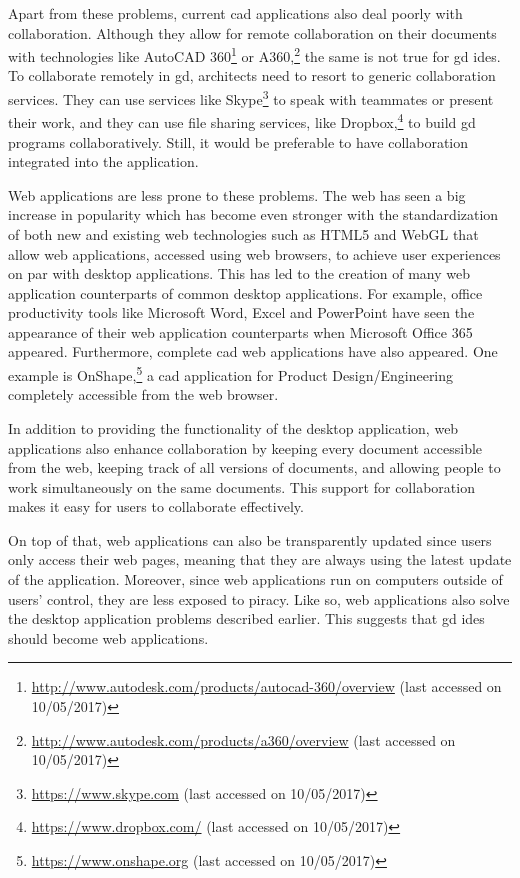 Apart from these problems, current \gls{cad} applications also deal poorly with collaboration.
Although they allow for remote collaboration on their documents with technologies like AutoCAD 360\footnote{\url{http://www.autodesk.com/products/autocad-360/overview} (last accessed on 10/05/2017)} or A360,\footnote{\url{http://www.autodesk.com/products/a360/overview} (last accessed on 10/05/2017)} the same is not true for \gls{gd} \glspl{ide}.
To collaborate remotely in \gls{gd}, architects need to resort to generic collaboration services.
They can use services like Skype\footnote{\url{https://www.skype.com} (last accessed on 10/05/2017)} to speak with teammates or present their work, and they can use file sharing services, like Dropbox,\footnote{\url{https://www.dropbox.com/} (last accessed on 10/05/2017)} to build \gls{gd} programs collaboratively.
Still, it would be preferable to have collaboration integrated into the application.

Web applications are less prone to these problems.
The web has seen a big increase in popularity which has become even stronger with the standardization of both new and existing web technologies such as HTML5\cite{hickson2011html5} and WebGL\cite{marrin2011webgl} that allow web applications, accessed using web browsers, to achieve user experiences on par with desktop applications.
This has led to the creation of many web application counterparts of common desktop applications.
For example, office productivity tools like Microsoft Word, Excel and PowerPoint have seen the appearance of their web application counterparts when Microsoft Office 365 appeared.
Furthermore, complete \gls{cad} web applications have also appeared.
One example is OnShape,\footnote{\url{https://www.onshape.org} (last accessed on 10/05/2017)} a \gls{cad} application for Product Design/Engineering completely accessible from the web browser.

In addition to providing the functionality of the desktop application, web applications also enhance collaboration by keeping every document accessible from the web, keeping track of all versions of documents, and allowing people to work simultaneously on the same documents.
This support for collaboration makes it easy for users to collaborate effectively.

On top of that, web applications can also be transparently updated since users only access their web pages, meaning that they are always using the latest update of the application. Moreover, since web applications run on computers outside of users' control, they are less exposed to piracy. Like so, web applications also solve the desktop application problems described earlier.
This suggests that \gls{gd} \glspl{ide} should become web applications.

